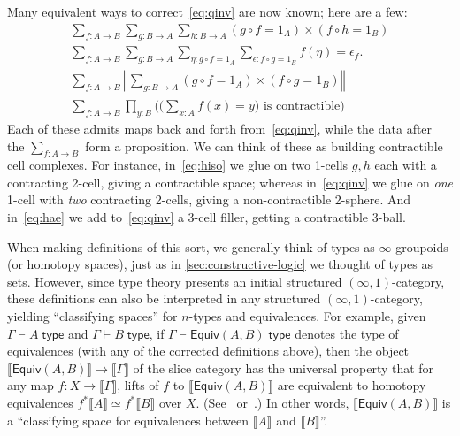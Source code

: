 \documentclass[12pt]{article}
\def\oo{\ensuremath{\infty}}
\def\io{\ensuremath{(\oo,1)}}
\def\ty{\;\mathsf{type}}
\def\m#1{\llbracket#1\rrbracket}
\def\types{\vdash}
\def\equiv{\mathsf{Equiv}}
\numberwithin{equation}{section}
\newcommand{\trunc}[2]{\mathopen{}\left\Vert #2\right\Vert_{#1}\mathclose{}}
\newcommand{\brck}[1]{\trunc{}{#1}}
\begin{document}
Many equivalent ways to correct~\eqref{eq:qinv} are now known; here are a few: %
\begin{gather}
  \textstyle\sum_{f:A\to B} \sum_{g:B\to A} \sum_{h:B\to A} (g\circ f = 1_A)\times (f\circ h = 1_B) \label{eq:hiso}\\
  \textstyle\sum_{f:A\to B} \sum_{g:B\to A} \sum_{\eta:g\circ f = 1_A}\sum_{\epsilon: f\circ g = 1_B} f(\eta) = \epsilon_f.\label{eq:hae}\\
  \textstyle\sum_{f:A\to B} \brck{\sum_{g:B\to A} (g\circ f = 1_A)\times (f\circ g = 1_B)}\\
  \textstyle\sum_{f:A\to B} \prod_{y:B} \Big(\big(\sum_{x:A} f(x)=y\big) \text{ is contractible}\Big)
\end{gather}
Each of these admits maps back and forth from~\eqref{eq:qinv},
while the data after the $\sum_{f:A\to B}$ form a proposition.
We can think of these as building contractible cell complexes.
For instance, in~\eqref{eq:hiso} we glue on two 1-cells $g,h$ each with a contracting 2-cell, giving a contractible space; whereas in~\eqref{eq:qinv} we glue on \emph{one} 1-cell with \emph{two} contracting 2-cells, giving a non-contractible 2-sphere.
And in~\eqref{eq:hae} we add to~\eqref{eq:qinv} a 3-cell filler, getting a contractible 3-ball.

When making definitions of this sort, we generally think of types as \oo-groupoids (or homotopy spaces), just as in \cref{sec:constructive-logic} we thought of types as sets.
However, since type theory presents an initial structured \io-category, these definitions can also be interpreted in any structured \io-category, yielding ``classifying spaces'' for $n$-types and equivalences.
For example, given $\Gamma\types A\ty$ and $\Gamma\types B\ty$, if $\Gamma\types\equiv(A,B)\ty$ denotes the type of equivalences (with any of the corrected definitions above), then the object $\m{\equiv(A,B)} \to \m\Gamma$ of the slice category has the universal property that for any map $f:X\to\m\Gamma$, lifts of $f$ to $\m{\equiv(A,B)}$ are equivalent to homotopy equivalences $f^*\m A \simeq f^* \m B$ over $X$.
(See~\cite[\S3]{klv:ssetmodel} or~\cite[\S4]{shulman:elreedy}.)
In other words, $\m{\equiv(A,B)}$ is a ``classifying space for equivalences between $\m A$ and $\m B$''.
\end{document}
